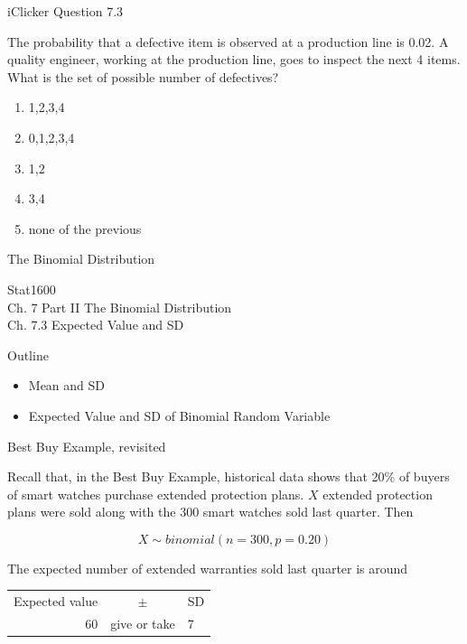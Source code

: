 \documentclass[14pt]{beamer}\usepackage[]{graphicx}\usepackage[]{color}
\begin{document}
\begin{frame}[fragile]{iClicker Question 7.3}

The probability that a defective item is observed at a production line  is 0.02. A quality engineer, working at the production line, goes to inspect the next 4 items.  What is the set of possible number of defectives?

\begin{enumerate}
\item {1,2,3,4}
\item {0,1,2,3,4}
\item {1,2}
\item {3,4}
\item none of the previous
\end{enumerate}
\end{frame}

\begin{frame}[fragile]{The Binomial Distribution}

Stat1600 \\
Ch. 7 Part II The Binomial Distribution \\
Ch. 7.3 Expected Value and SD

\end{frame}

\begin{frame}[fragile]{Outline}

\begin{itemize}
\item Mean and SD
\item  Expected Value and SD of Binomial Random Variable
\end{itemize}

\end{frame}

\begin{frame}[fragile]{Best Buy Example, revisited}

{\small{
Recall that, in the Best Buy Example, historical data shows that 20\% of buyers of smart watches purchase extended protection plans. $X$ extended protection plans were sold along with the 300 smart watches sold last quarter.  Then
}}

$$ X \sim binomial(n = 300, p = 0.20) $$

{\small{
The expected number of extended warranties sold last quarter is around
}}

\begin{table}
\centering
{\small{
\begin{tabular}{@{} rcl @{}}
Expected value & $\pm $ & SD \\
60 & give or take & 7 
\end{tabular}
}}
\end{table}

\end{frame}
\end{document}
